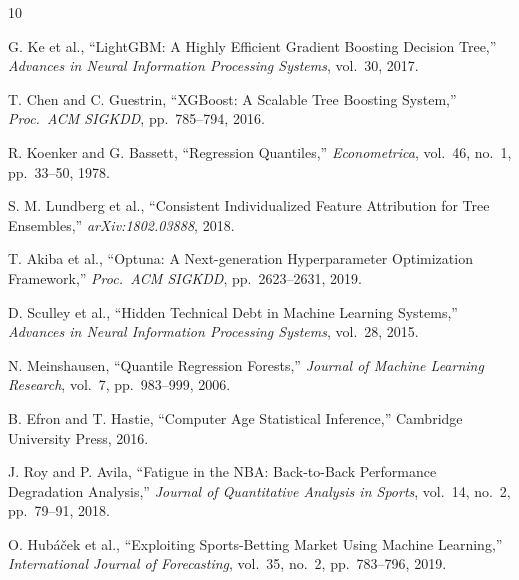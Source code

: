\documentclass[conference]{IEEEtran}
\begin{document}

\begin{thebibliography}{10}

G. Ke et al., ``LightGBM: A Highly Efficient Gradient Boosting Decision Tree,''
\textit{Advances in Neural Information Processing Systems}, vol.~30, 2017.

T. Chen and C. Guestrin, ``XGBoost: A Scalable Tree Boosting System,''
\textit{Proc.\ ACM SIGKDD}, pp.~785--794, 2016.

R. Koenker and G. Bassett, ``Regression Quantiles,''
\textit{Econometrica}, vol.~46, no.~1, pp.~33--50, 1978.

S. M. Lundberg et al., ``Consistent Individualized Feature Attribution
for Tree Ensembles,'' \textit{arXiv:1802.03888}, 2018.

T. Akiba et al., ``Optuna: A Next-generation Hyperparameter Optimization
Framework,'' \textit{Proc.\ ACM SIGKDD}, pp.~2623--2631, 2019.

D. Sculley et al., ``Hidden Technical Debt in Machine Learning Systems,''
\textit{Advances in Neural Information Processing Systems}, vol.~28, 2015.

N. Meinshausen, ``Quantile Regression Forests,''
\textit{Journal of Machine Learning Research}, vol.~7, pp.~983--999, 2006.

B. Efron and T. Hastie, ``Computer Age Statistical Inference,''
Cambridge University Press, 2016.

J. Roy and P. Avila, ``Fatigue in the NBA: Back-to-Back Performance
Degradation Analysis,'' \textit{Journal of Quantitative Analysis in Sports},
vol.~14, no.~2, pp.~79--91, 2018.

O. Hub\'{a}\v{c}ek et al., ``Exploiting Sports-Betting Market Using
Machine Learning,'' \textit{International Journal of Forecasting},
vol.~35, no.~2, pp.~783--796, 2019.

\end{thebibliography}
\end{document}
